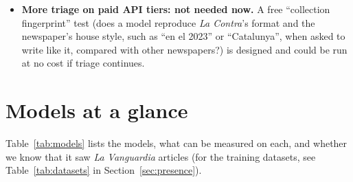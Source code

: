 \documentclass[10pt,a4paper]{article}
\begin{document}
\begin{itemize}
one error page, have 245 to 1,279 copies (Table~\ref{tab:mostcopied}). They are the best targets; controls should be articles published after
the training cutoffs with a comparable number of copies (FineWeb-2 stops in 2024, so their copies must be counted in
later Common Crawl captures). Pre-registered as M13 (\texttt{docs/prereg/m13\_most\_copied.md}), with ordinary post-cutoff
controls: done on five models (Salamandra, Llama-3.1, Qwen2.5, Claude Opus 4.5, Gemini 3.1 Flash-Lite), all at control
level; the long runs are famous quotations, and the one article where Claude reproduced fragments (Garnier) did not
generalize to the next three most-copied interviews (Section~\ref{sec:results}). The current Claude models (Opus, Sonnet and Haiku 5.5) cannot be tested with our controls: their training
data runs to June 2026, past every control article we have.
\item \textbf{More triage on paid API tiers: not needed now.} A free ``collection fingerprint'' test (does a model reproduce \emph{La
Contra}'s format and the newspaper's house style, such as ``en el 2023'' or ``Catalunya'', when asked to write like
it, compared with other newspapers?) is designed and could be run at no cost if triage continues.
\end{itemize}

\section{Models at a glance}\label{sec:glance}
Table~\ref{tab:models} lists the models, what can be measured on each, and whether we know that it saw \emph{La Vanguardia} articles
(for the training datasets, see Table~\ref{tab:datasets} in Section~\ref{sec:presence}).
\end{document}
